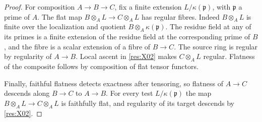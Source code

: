 \documentclass[11pt,oneside,openany]{book}
\theoremstyle{definition}
\theoremstyle{remark}
\begin{document}
\begin{proof}
For composition \(A\to B\to C\), fix a finite extension \(L/\kappa(\mathfrak p)\), with \(\mathfrak p\) a prime of \(A\). The flat map \(B\otimes_A L\to C\otimes_A L\) has regular fibres. Indeed \(B\otimes_A L\) is finite over the localization and quotient \(B\otimes_A\kappa(\mathfrak p)\). The residue field at any of its primes is a finite extension of the residue field at the corresponding prime of \(B\), and the fibre is a scalar extension of a fibre of \(B\to C\). The source ring is regular by regularity of \(A\to B\). Local ascent in \ref{res:X02} makes \(C\otimes_A L\) regular. Flatness of the composite follows by composition of flat tensor functors.

Finally, faithful flatness detects exactness after tensoring, so flatness of \(A\to C\) descends along \(B\to C\) to \(A\to B\). For every test \(L/\kappa(\mathfrak p)\) the map \(B\otimes_A L\to C\otimes_A L\) is faithfully flat, and regularity of its target descends by \ref{res:X02}.
\end{proof}
\end{document}
